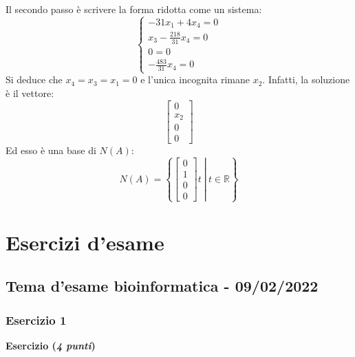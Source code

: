 \documentclass[a4paper]{article}
\begin{document}
	Il \textcolor{Red3}{secondo passo} è scrivere la forma ridotta come un sistema:
	\begin{equation*}
		\begin{cases}
			-31x_{1} + 4x_{4} = 0 \\
			x_{3} -\frac{218}{31} x_{4} = 0 \\
			0 = 0 \\
			-\frac{483}{31}x_{4} = 0
		\end{cases}
	\end{equation*}
	Si deduce che $x_{4} = x_{3} = x_{1} = 0$ e l'unica incognita rimane $x_{2}$. Infatti, la soluzione è il vettore:
	\begin{equation*}
		\begin{bmatrix}
			0 \\
			x_{2} \\
			0 \\
			0
		\end{bmatrix}
	\end{equation*}
	Ed esso è una base di $N\left(A\right)$:
	\begin{equation*}
		N\left(A\right) = \left\{\left.\begin{bmatrix}
			0 \\
			1 \\
			0 \\
			0
		\end{bmatrix} t \: \right| \: t \in \mathbb{R} \right\}
	\end{equation*}\newpage

	\section{Esercizi d'esame}
	
	\subsection{Tema d'esame bioinformatica - 09/02/2022}
	
	\subsubsection{Esercizio 1}
	
	\textcolor{Red3}{\textbf{Esercizio (\emph{4 punti})}}\newline
	
\end{document}
